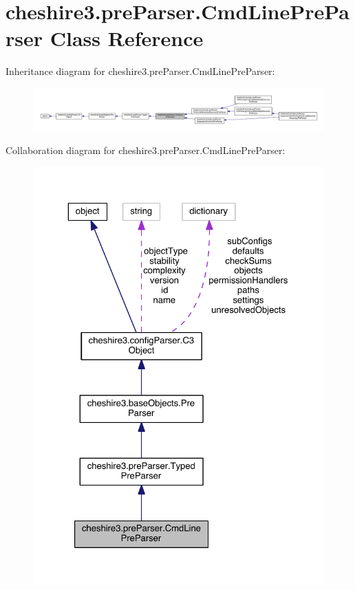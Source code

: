 \hypertarget{classcheshire3_1_1pre_parser_1_1_cmd_line_pre_parser}{\section{cheshire3.\-pre\-Parser.\-Cmd\-Line\-Pre\-Parser Class Reference}
\label{classcheshire3_1_1pre_parser_1_1_cmd_line_pre_parser}
}


Inheritance diagram for cheshire3.\-pre\-Parser.\-Cmd\-Line\-Pre\-Parser\-:
\nopagebreak
\begin{figure}[H]
\begin{center}
\leavevmode
\includegraphics[width=350pt]{classcheshire3_1_1pre_parser_1_1_cmd_line_pre_parser__inherit__graph}
\end{center}
\end{figure}


Collaboration diagram for cheshire3.\-pre\-Parser.\-Cmd\-Line\-Pre\-Parser\-:
\nopagebreak
\begin{figure}[H]
\begin{center}
\leavevmode
\includegraphics[width=325pt]{classcheshire3_1_1pre_parser_1_1_cmd_line_pre_parser__coll__graph}
\end{center}
\end{figure}
